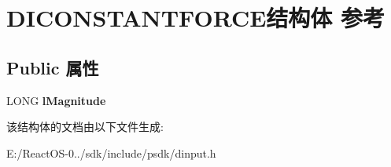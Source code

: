 \hypertarget{struct_d_i_c_o_n_s_t_a_n_t_f_o_r_c_e}{}\section{D\+I\+C\+O\+N\+S\+T\+A\+N\+T\+F\+O\+R\+C\+E结构体 参考}
\label{struct_d_i_c_o_n_s_t_a_n_t_f_o_r_c_e}
\subsection*{Public 属性}
\begin{DoxyCompactItemize}
\item 
\mbox{\label{struct_d_i_c_o_n_s_t_a_n_t_f_o_r_c_e_acd4398bd51436ca93853bcd4acae10ac}} 
L\+O\+NG {\bfseries l\+Magnitude}
\end{DoxyCompactItemize}


该结构体的文档由以下文件生成\+:\begin{DoxyCompactItemize}
\item 
E\+:/\+React\+O\+S-\/0../sdk/include/psdk/dinput.\+h\end{DoxyCompactItemize}
